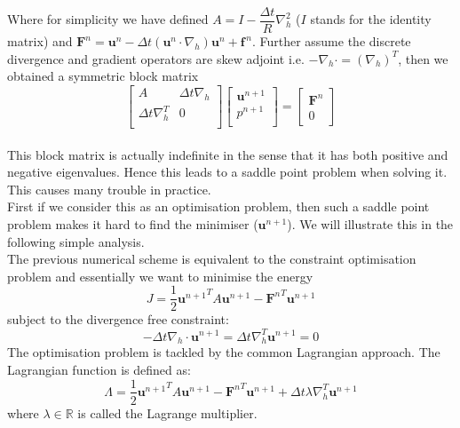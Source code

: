 Where for simplicity we have defined $A = I - \dfrac{\Delta t}{R}\nabla_h^2$ ($I$ stands for the identity matrix) and
$\textbf{F}^n = \textbf{u}^n  - \Delta t(\textbf{u}^n\cdot\nabla_h)\textbf{u}^n + \textbf{f}^{\,n}$. Further assume the discrete divergence and gradient operators are skew adjoint i.e. $-\nabla_h \cdot = (\nabla_h)^T$, then we obtained a symmetric block matrix \cite{maria2003application}\\

\begin{equation}\label{backward Euler symmetric block matrix form}
\begin{bmatrix}
A & \Delta t \nabla_h\\
\Delta t \nabla_h^T & 0\\
\end{bmatrix}
\begin{bmatrix}
\textbf{u}^{n+1}\\
p^{n+1}\\
\end{bmatrix}
= \begin{bmatrix}
\textbf{F}^n\\
0
\end{bmatrix}
\end{equation}\\
This block matrix is actually indefinite in the sense that it has both positive and negative eigenvalues. Hence this leads to a saddle point problem when solving it. This causes many trouble in practice.\\

First if we consider this as an optimisation problem, then such a saddle point problem makes it hard to find the minimiser ($\textbf{u}^{n+1}$). We will illustrate this in the following simple analysis.\\

The previous numerical scheme is equivalent to the constraint optimisation problem and essentially we want to minimise the energy 
\begin{equation*}\label{energy optimisation formulation}
J = \dfrac{1}{2}{\textbf{u}^{n+1}}^T A\textbf{u}^{n+1} - {\textbf{F}^n}^T\textbf{u}^{n+1}
\end{equation*}
subject to the divergence free constraint:
\begin{equation*}
-\Delta t \nabla_h \cdot \textbf{u}^{n+1} = \Delta t \nabla_h^T \textbf{u}^{n+1} = 0
\end{equation*}
The optimisation problem is tackled by the common Lagrangian approach. The Lagrangian function is defined as:
\begin{equation*}\label{eq:Lagrangian function}
\Lambda = \dfrac{1}{2}{\textbf{u}^{n+1}}^T A\textbf{u}^{n+1} - {\textbf{F}^n}^T\textbf{u}^{n+1} + \Delta t \lambda \nabla_h^T \textbf{u}^{n+1}
\end{equation*}
where $\lambda \in \mathbb{R}$ is called the Lagrange multiplier.\\

